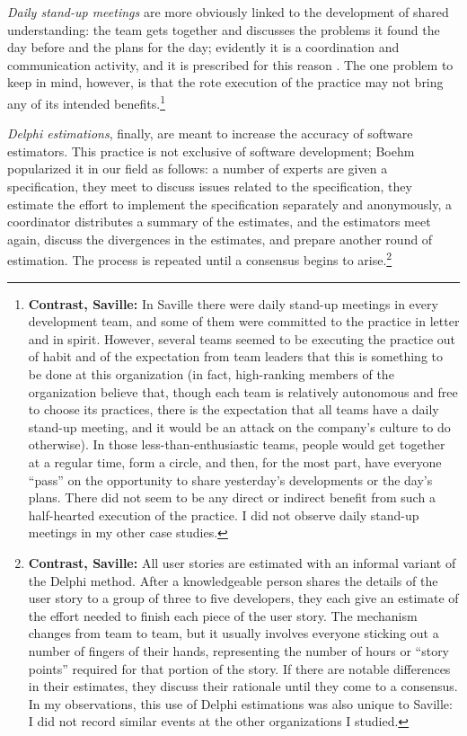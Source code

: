 \emph{Daily stand-up meetings} are more obviously linked to the development of shared understanding: the team gets together and discusses the problems it found the day before and the plans for the day; evidently it is a coordination and communication activity, and it is prescribed for this reason \cite{Schwaber2001}. The one problem to keep in mind, however, is that the rote execution of the practice may not bring any of its intended benefits.\footnote{\textbf{Contrast, Saville:} In Saville there were daily stand-up meetings in every development team, and some of them were committed to the practice in letter and in spirit. However, several teams seemed to be executing the practice out of habit and of the expectation from team leaders that this is something to be done at this organization (in fact, high-ranking members of the organization believe that, though each team is relatively autonomous and free to choose its practices, there is the expectation that all teams have a daily stand-up meeting, and it would be an attack on the company's culture to do otherwise). In those less-than-enthusiastic teams, people would get together at a regular time, form a circle, and then, for the most part, have everyone ``pass'' on the opportunity to share yesterday's developments or the day's plans. There did not seem to be any direct or indirect benefit from such a half-hearted execution of the practice. I did not observe daily stand-up meetings in my other case studies.}

\emph{Delphi estimations}, finally, are meant to increase the accuracy of software estimators. This practice is not exclusive of software development; Boehm  popularized it in our field as follows: a number of experts are given a specification, they meet to discuss issues related to the specification, they estimate the effort to implement the specification separately and anonymously, a coordinator distributes a summary of the estimates, and the estimators meet again, discuss the divergences in the estimates, and prepare another round of estimation. The process is repeated until a consensus begins to arise.\footnote{\textbf{Contrast, Saville:} All user stories are estimated with an informal variant of the Delphi method. After a knowledgeable person shares the details of the user story to a group of three to five developers, they each give an estimate of the effort needed to finish each piece of the user story. The mechanism changes from team to team, but it usually involves everyone sticking out a number of fingers of their hands, representing the number of hours or ``story points'' required for that portion of the story. If there are notable differences in their estimates, they discuss their rationale until they come to a consensus. In my observations, this use of Delphi estimations was also unique to Saville: I did not record similar events at the other organizations I studied.}

